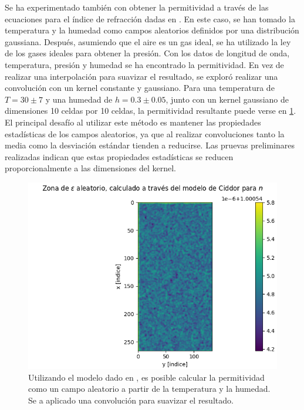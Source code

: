 Se ha experimentado también con obtener la permitividad a través de las ecuaciones para el índice de refracción dadas en \cite{ciddor_refractive_1996}. En este caso, se han tomado la temperatura y la humedad como campos aleatorios definidos por una distribución gaussiana. Después, asumiendo que el aire es un gas ideal, se ha utilizado la ley de los gases ideales para obtener la presión. Con los datos de longitud de onda, temperatura, presión y humedad se ha encontrado la permitividad. En vez de realizar una interpolación para suavizar el resultado, se exploró realizar una convolución con un kernel constante y gaussiano. Para una temperatura de $T=30\pm7$ y una humedad de $h = 0.3\pm0.05$, junto con un kernel gaussiano de dimensiones 10 celdas por 10 celdas, la permitividad resultante puede verse en \ref{fig:perm_aleatoria_ciddor}. El principal desafío al utilizar este método es mantener las propiedades estadísticas de los campos aleatorios, ya que al realizar convoluciones tanto la media como la desviación estándar tienden a reducirse. Las pruevas preliminares realizadas indican que estas propiedades estadísticas se reducen proporcionalmente a las dimensiones del kernel. 

\begin{figure}
    \centering
    \includegraphics[width=0.7\linewidth]{figures/perm_aletoria_ciddor.png}
    \caption{Utilizando el modelo dado en \cite{ciddor_refractive_1996}, es posible calcular la permitividad como un campo aleatorio a partir de la temperatura y la humedad. Se a aplicado una convolución para suavizar el resultado.}
    \label{fig:perm_aleatoria_ciddor}
\end{figure}
